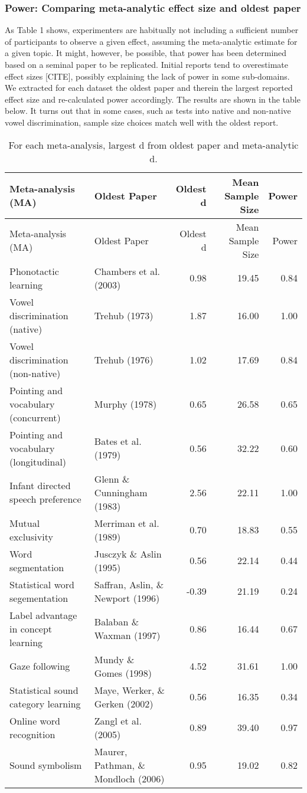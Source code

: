 \documentclass[english,floatsintext,man]{apa6}
\begin{document}
\subsubsection{Power: Comparing meta-analytic effect size and oldest
paper}\label{power-comparing-meta-analytic-effect-size-and-oldest-paper}

As Table 1 shows, experimenters are habitually not including a
sufficient number of participants to observe a given effect, assuming
the meta-analytic estimate for a given topic. It might, however, be
possible, that power has been determined based on a seminal paper to be
replicated. Initial reports tend to overestimate effect sizes
{[}CITE{]}, possibly explaining the lack of power in some sub-domains.
We extracted for each dataset the oldest paper and therein the largest
reported effect size and re-calculated power accordingly. The results
are shown in the table below. It turns out that in some cases, such as
tests into native and non-native vowel discrimination, sample size
choices match well with the oldest report.

\begin{longtable}[]{@{}llrrr@{}}
\caption{For each meta-analysis, largest d from oldest paper and
meta-analytic d.}\tabularnewline
\toprule
Meta-analysis (MA) & Oldest Paper & Oldest d & Mean Sample Size &
Power\tabularnewline
\midrule
\endfirsthead
\toprule
Meta-analysis (MA) & Oldest Paper & Oldest d & Mean Sample Size &
Power\tabularnewline
\midrule
\endhead
Phonotactic learning & Chambers et al. (2003) & 0.98 & 19.45 &
0.84\tabularnewline
Vowel discrimination (native) & Trehub (1973) & 1.87 & 16.00 &
1.00\tabularnewline
Vowel discrimination (non-native) & Trehub (1976) & 1.02 & 17.69 &
0.84\tabularnewline
Pointing and vocabulary (concurrent) & Murphy (1978) & 0.65 & 26.58 &
0.65\tabularnewline
Pointing and vocabulary (longitudinal) & Bates et al. (1979) & 0.56 &
32.22 & 0.60\tabularnewline
Infant directed speech preference & Glenn \& Cunningham (1983) & 2.56 &
22.11 & 1.00\tabularnewline
Mutual exclusivity & Merriman et al. (1989) & 0.70 & 18.83 &
0.55\tabularnewline
Word segmentation & Jusczyk \& Aslin (1995) & 0.56 & 22.14 &
0.44\tabularnewline
Statistical word segementation & Saffran, Aslin, \& Newport (1996) &
-0.39 & 21.19 & 0.24\tabularnewline
Label advantage in concept learning & Balaban \& Waxman (1997) & 0.86 &
16.44 & 0.67\tabularnewline
Gaze following & Mundy \& Gomes (1998) & 4.52 & 31.61 &
1.00\tabularnewline
Statistical sound category learning & Maye, Werker, \& Gerken (2002) &
0.56 & 16.35 & 0.34\tabularnewline
Online word recognition & Zangl et al. (2005) & 0.89 & 39.40 &
0.97\tabularnewline
Sound symbolism & Maurer, Pathman, \& Mondloch (2006) & 0.95 & 19.02 &
0.82\tabularnewline
\bottomrule
\end{longtable}
\end{document}
